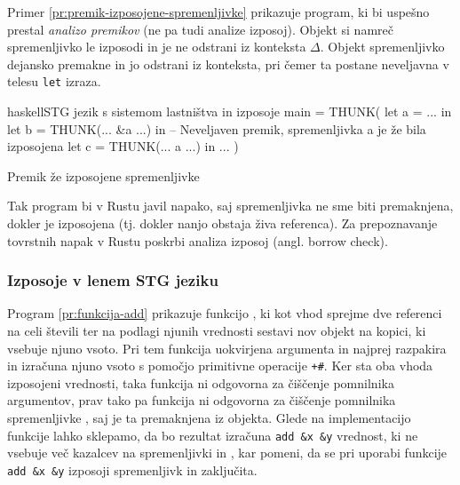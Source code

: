 Primer \ref{pr:premik-izposojene-spremenljivke} prikazuje program, ki bi uspešno prestal \emph{analizo premikov} (ne pa tudi analize izposoj). Objekt  si namreč spremenljivko  le izposodi in je ne odstrani iz konteksta $\Delta$. Objekt  spremenljivko  dejansko premakne in jo odstrani iz konteksta, pri čemer ta postane neveljavna v telesu \texttt{let} izraza.

\begin{primer}[ht]
\centering
\begin{code-box}{haskell}{STG jezik s sistemom lastništva in izposoje \cmark}
main = THUNK(
    let a = ... in
    let b = THUNK(... &a ...) in
    -- Neveljaven premik, spremenljivka a je že bila izposojena
    let c = THUNK(... a ...) in
        ...
)
\end{code-box}
\caption{Premik že izposojene spremenljivke}
\label{pr:premik-izposojene-spremenljivke}
\end{primer}

Tak program bi v Rustu javil napako, saj spremenljivka ne sme biti premaknjena, dokler je izposojena (tj. dokler nanjo obstaja živa referenca). Za prepoznavanje tovrstnih napak v Rustu poskrbi analiza izposoj (angl. borrow check).

\subsubsection{Izposoje v lenem STG jeziku}



Program \ref{pr:funkcija-add} prikazuje funkcijo , ki kot vhod sprejme dve referenci na celi števili ter na podlagi njunih vrednosti sestavi nov objekt  na kopici, ki vsebuje njuno vsoto. Pri tem funkcija uokvirjena argumenta  in  najprej razpakira in izračuna njuno vsoto s pomočjo primitivne operacije \texttt{+\#}. Ker sta oba vhoda izposojeni vrednosti, taka funkcija ni odgovorna za čiščenje pomnilnika argumentov, prav tako pa funkcija ni odgovorna za čiščenje pomnilnika spremenljivke , saj je ta premaknjena iz objekta. Glede na implementacijo funkcije  lahko sklepamo, da bo rezultat izračuna \texttt{add \&x \&y} vrednost, ki ne vsebuje več kazalcev na spremenljivki  in , kar pomeni, da se pri uporabi funkcije \texttt{add \&x \&y} izposoji spremenljivk  in  zaključita.

